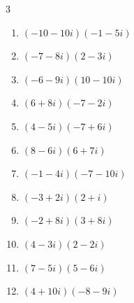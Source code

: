 \begin{multicols}{3}
\begin{enumerate}
        \phantom{$\displaystyle =70-10i$}

  \item $\displaystyle (-10-10i)(-1-5i)$

        \phantom{$\displaystyle =-40+60i$}

\columnbreak %

\resetques

  \item $\displaystyle (-7-8i)(2-3i)$

        \phantom{$\displaystyle =-38+5i$}

  \item $\displaystyle (-6-9i)(10-10i)$

        \phantom{$\displaystyle =-150-30i$}

  \item $\displaystyle (6+8i)(-7-2i)$

        \phantom{$\displaystyle =-26-68i$}

  \item $\displaystyle (4-5i)(-7+6i)$

        \phantom{$\displaystyle =2+59i$}

  \item $\displaystyle (8-6i)(6+7i)$

        \phantom{$\displaystyle =90+20i$}

  \item $\displaystyle (-1-4i)(-7-10i)$

        \phantom{$\displaystyle =-33+38i$}

  \item $\displaystyle (-3+2i)(2+i)$

        \phantom{$\displaystyle =-8+i$}

  \item $\displaystyle (-2+8i)(3+8i)$

        \phantom{$\displaystyle =-70+8i$}

  \item $\displaystyle (4-3i)(2-2i)$

        \phantom{$\displaystyle =2-14i$}

  \item $\displaystyle (7-5i)(5-6i)$

        \phantom{$\displaystyle =5-67i$}

  \item $\displaystyle (4+10i)(-8-9i)$

        \phantom{$\displaystyle =58-116i$}


\end{enumerate}
\end{multicols}
